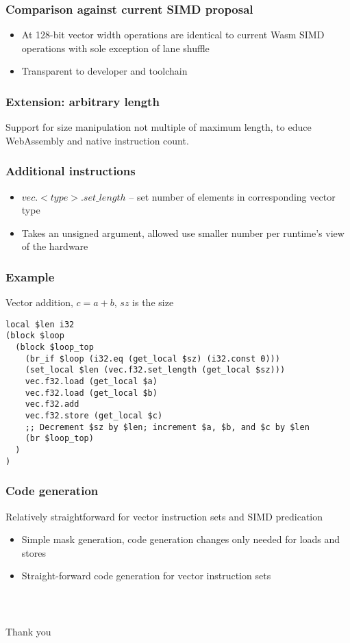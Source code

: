 \documentclass[t,aspectratio=169, xcolor={table}]{beamer}
\begin{document}
\begin{frame}
\frametitle{Comparison against current SIMD proposal}
  \begin{itemize}
  \item At 128-bit vector width operations are identical to current Wasm SIMD operations with sole exception of lane shuffle
  \item Transparent to developer and toolchain
  \end{itemize}
\end{frame}
\begin{frame}
\frametitle{Extension: arbitrary length}
  Support for size manipulation not multiple of maximum length, to educe WebAssembly and native instruction count.
\end{frame}
\begin{frame}
\frametitle{Additional instructions}
  \begin{itemize}
  \item $vec.<type>.set\_length$ -- set number of elements in corresponding vector type
  \item[] Takes an unsigned argument, allowed use smaller number per runtime's view of the hardware
  \end{itemize}
\end{frame}
\begin{frame}[containsverbatim]
\frametitle{Example}
Vector addition, $c = a + b$, $sz$ is the size
\begin{lstlisting}
local $len i32
(block $loop
  (block $loop_top
    (br_if $loop (i32.eq (get_local $sz) (i32.const 0)))
    (set_local $len (vec.f32.set_length (get_local $sz)))
    vec.f32.load (get_local $a)
    vec.f32.load (get_local $b)
    vec.f32.add
    vec.f32.store (get_local $c)
    ;; Decrement $sz by $len; increment $a, $b, and $c by $len
    (br $loop_top)
  )
)
\end{lstlisting}
\end{frame}
\begin{frame}
\frametitle{Code generation}
  Relatively straightforward for vector instruction sets and SIMD predication
  \begin{itemize}
  \item Simple mask generation, code generation changes only needed for loads and stores
  \item Straight-forward code generation for vector instruction sets
  \end{itemize}
\end{frame}
\begin{frame}
\frametitle{~}
\huge{Thank you}
\end{frame}
\end{document}
